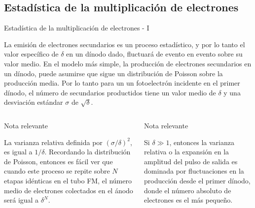 \documentclass[a4paper,10pt]{beamer}
\begin{document}
\subsection{Estadística de la multiplicación de electrones}
\begin{frame}{Estadística de la multiplicación de electrones - I}

\begin{justify}
 La emisión de electrones secundarios es un proceso estadístico, y por lo tanto el 
 valor específico de $\delta$ en un dínodo dado, fluctuará de evento en evento sobre 
 su valor medio. En el modelo más simple, la producción de electrones secundarios en 
 un dínodo, puede asumirse que sigue un distribución de Poisson sobre la producción media.
 Por lo tanto para un un fotoelectrón incidente en el primer dínodo, el número de 
 secundarios productidos tiene un valor medio de $\delta$ y una desviación estándar 
 $\sigma$ de $\sqrt{\delta}$.
 \end{justify}
 
 \begin{columns}[c]

 \column{2in}
 \begin{block}{Nota relevante}
 \begin{justify}
 \begin{footnotesize}
 La varianza relativa definida por $(\sigma/\delta)^2$, es igual a $1/\delta$. Recordando 
 la distribución de Poisson, entonces es fácil ver que cuando este proceso se repite 
 sobre $N$ etapas idénticas en el tubo FM, el número medio de electrones colectados en 
 el ánodo será igual a $\delta^N$.
 \end{footnotesize}
 \end{justify}
 \end{block}
 \column{2in}
 \begin{block}{Nota relevante}
 \begin{justify}
  Si $\delta \gg 1$, entonces la varianza relativa o la expansión en la amplitud 
  del pulso de salida es dominada por fluctuaciones en la producción desde el primer
  dínodo, donde el número absoluto de electrones es el más pequeño.
  \end{justify}
 \end{block}
 \end{columns}

\end{frame}
\end{document}
